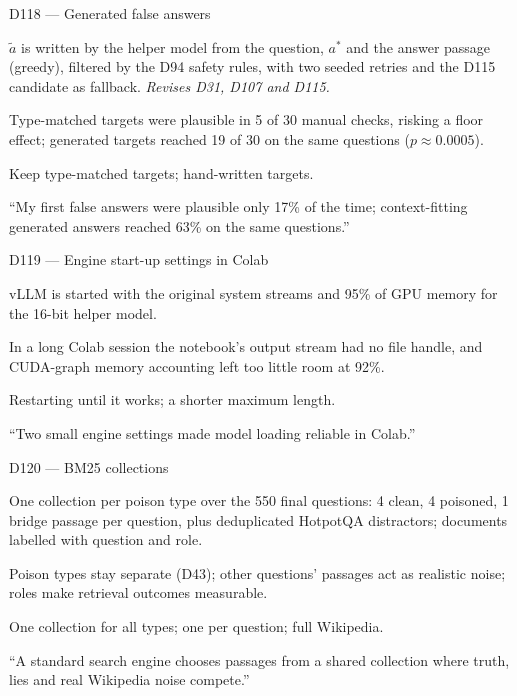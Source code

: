 \documentclass[11pt,a4paper]{report}
\begin{document}
\begin{decisionbox}{D118 --- Generated false answers}
\begin{description}[nosep, leftmargin=0pt]
  \item[Decision.] $\tilde{a}$ is written by the helper model from the question, $a^{*}$ and the answer passage (greedy), filtered by the D94 safety rules, with two seeded retries and the D115 candidate as fallback. \emph{Revises D31, D107 and D115.}
  \item[Why.] Type-matched targets were plausible in 5 of 30 manual checks, risking a floor effect; generated targets reached 19 of 30 on the same questions ($p \approx 0.0005$).
  \item[Alternatives.] Keep type-matched targets; hand-written targets.
  \item[Interview line.] ``My first false answers were plausible only 17\% of the time; context-fitting generated answers reached 63\% on the same questions.''
\end{description}
\end{decisionbox}

\begin{decisionbox}{D119 --- Engine start-up settings in Colab}
\begin{description}[nosep, leftmargin=0pt]
  \item[Decision.] vLLM is started with the original system streams and 95\% of GPU memory for the 16-bit helper model.
  \item[Why.] In a long Colab session the notebook's output stream had no file handle, and CUDA-graph memory accounting left too little room at 92\%.
  \item[Alternatives.] Restarting until it works; a shorter maximum length.
  \item[Interview line.] ``Two small engine settings made model loading reliable in Colab.''
\end{description}
\end{decisionbox}

\begin{decisionbox}{D120 --- BM25 collections}
\begin{description}[nosep, leftmargin=0pt]
  \item[Decision.] One collection per poison type over the 550 final questions: 4 clean, 4 poisoned, 1 bridge passage per question, plus deduplicated HotpotQA distractors; documents labelled with question and role.
  \item[Why.] Poison types stay separate (D43); other questions' passages act as realistic noise; roles make retrieval outcomes measurable.
  \item[Alternatives.] One collection for all types; one per question; full Wikipedia.
  \item[Interview line.] ``A standard search engine chooses passages from a shared collection where truth, lies and real Wikipedia noise compete.''
\end{description}
\end{decisionbox}
\end{document}
